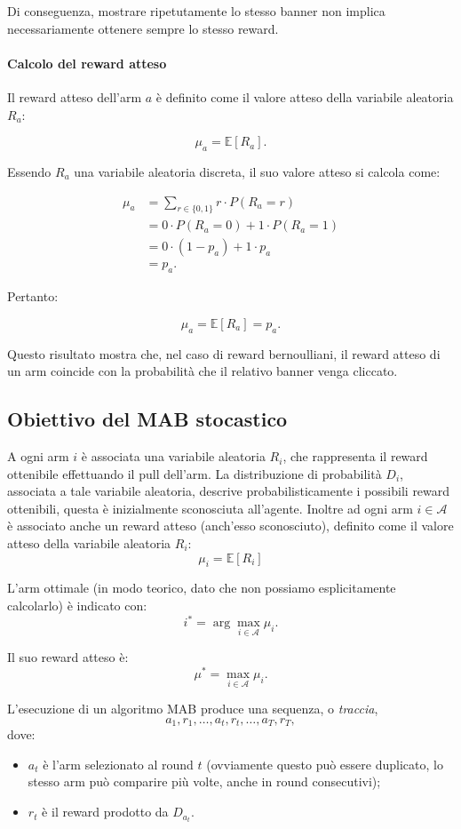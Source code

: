Di conseguenza, mostrare ripetutamente lo stesso banner non implica necessariamente ottenere sempre lo stesso reward.

\paragraph{Calcolo del reward atteso}

Il reward atteso dell'arm $a$ è definito come il valore atteso della variabile aleatoria $R_a$:

\[
\mu_a = \mathbb{E}[R_a].
\]

Essendo $R_a$ una variabile aleatoria discreta, il suo valore atteso si calcola come:

\[
\begin{aligned}
\mu_a
&= \sum_{r \in \{0,1\}} r \cdot P(R_a=r)\\
&= 0 \cdot P(R_a=0) + 1 \cdot P(R_a=1)\\
&= 0 \cdot (1-p_a) + 1 \cdot p_a\\
&= p_a.
\end{aligned}
\]

Pertanto:

\[
\boxed{\mu_a = \mathbb{E}[R_a] = p_a.}
\]

Questo risultato mostra che, nel caso di reward bernoulliani, il reward atteso di un arm coincide con la probabilità che il relativo banner venga cliccato.

\newpage
\subsection{Obiettivo del MAB stocastico}
A ogni arm \(i\) è associata una variabile aleatoria \(R_i\), che rappresenta il reward ottenibile effettuando il pull dell'arm. La distribuzione di probabilità \(D_i\), associata a tale variabile aleatoria, descrive probabilisticamente i possibili reward ottenibili, questa è inizialmente sconosciuta all'agente.
Inoltre ad ogni arm \(i\in\mathcal A\) è associato anche un reward atteso (anch'esso sconosciuto), definito come il valore atteso della variabile aleatoria \(R_i\):
\[
\boxed{\mu_i=\mathbb E[R_i]}
\]


L'arm ottimale (in modo teorico, dato che non possiamo esplicitamente calcolarlo) è indicato con:
\[
i^*=\arg\max_{i\in\mathcal{A}}\mu_i.
\]

Il suo reward atteso è:
\[
\mu^*=\max_{i\in\mathcal{A}}\mu_i.
\]

L'esecuzione di un algoritmo MAB produce una sequenza, o \emph{traccia},
\[
a_1,r_1,\ldots,a_t,r_t,\ldots,a_T,r_T,
\]
dove:
\begin{itemize}
    \item $a_t$ è l'arm selezionato al round $t$ (ovviamente questo può essere duplicato, lo stesso arm può comparire più volte, anche in round consecutivi);
    \item $r_t$ è il reward prodotto da $D_{a_t}$.
\end{itemize}

